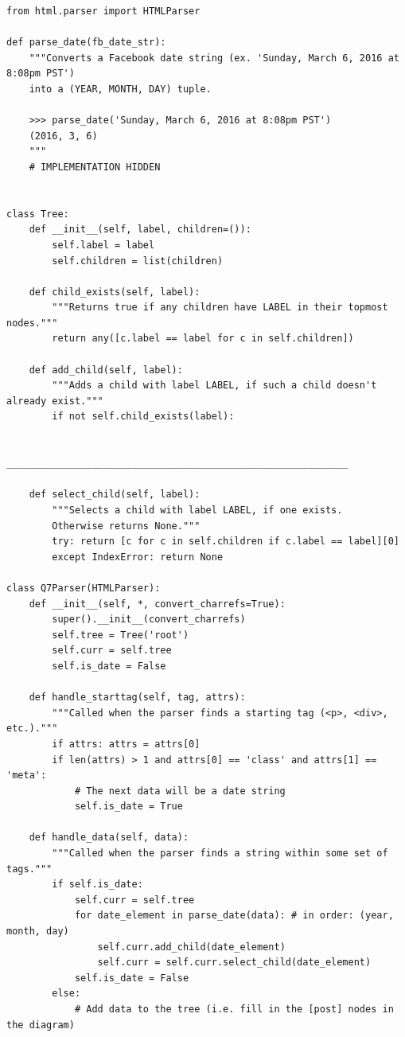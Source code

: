 \documentclass[11pt]{article}
\begin{document}
\begin{lstlisting}
from html.parser import HTMLParser

def parse_date(fb_date_str):
    """Converts a Facebook date string (ex. 'Sunday, March 6, 2016 at 8:08pm PST')
    into a (YEAR, MONTH, DAY) tuple.
    
    >>> parse_date('Sunday, March 6, 2016 at 8:08pm PST')
    (2016, 3, 6)
    """
    # IMPLEMENTATION HIDDEN
    
    
class Tree:
    def __init__(self, label, children=()):
        self.label = label
        self.children = list(children)
        
    def child_exists(self, label):
        """Returns true if any children have LABEL in their topmost nodes."""
        return any([c.label == label for c in self.children])
    
    def add_child(self, label):
        """Adds a child with label LABEL, if such a child doesn't already exist."""
        if not self.child_exists(label):
        
            ____________________________________________________________
        
    def select_child(self, label):
        """Selects a child with label LABEL, if one exists.
        Otherwise returns None."""
        try: return [c for c in self.children if c.label == label][0]
        except IndexError: return None

class Q7Parser(HTMLParser):
    def __init__(self, *, convert_charrefs=True):
        super().__init__(convert_charrefs)
        self.tree = Tree('root')
        self.curr = self.tree
        self.is_date = False
        
    def handle_starttag(self, tag, attrs):
        """Called when the parser finds a starting tag (<p>, <div>, etc.)."""
        if attrs: attrs = attrs[0]
        if len(attrs) > 1 and attrs[0] == 'class' and attrs[1] == 'meta':
            # The next data will be a date string
            self.is_date = True
        
    def handle_data(self, data):
        """Called when the parser finds a string within some set of tags."""
        if self.is_date:
            self.curr = self.tree
            for date_element in parse_date(data): # in order: (year, month, day)
                self.curr.add_child(date_element)
                self.curr = self.curr.select_child(date_element)
            self.is_date = False
        else:
            # Add data to the tree (i.e. fill in the [post] nodes in the diagram)
            

\end{lstlisting}
\end{document}
